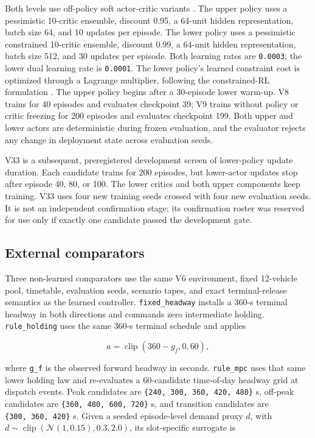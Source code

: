 \documentclass[preprint,12pt,authoryear,nopreprintline]{elsarticle}
\begin{document}
Both levels use off-policy soft actor-critic variants
\citep{haarnoja2018soft}. The upper policy uses a pessimistic 10-critic
ensemble, discount 0.95, a 64-unit hidden representation, batch size 64,
and 10 updates per episode. The lower policy uses a pessimistic
constrained 10-critic ensemble, discount 0.99, a 64-unit hidden
representation, batch size 512, and 30 updates per episode. Both
learning rates are \texttt{0.0003}; the lower dual learning rate is
\texttt{0.0001}. The lower policy's learned constraint cost is optimized
through a Lagrange multiplier, following the constrained-RL formulation
\citep{miryoosefi2019constraints}. The upper policy begins after a
30-episode lower warm-up. V8 trains for 40 episodes and evaluates
checkpoint 39; V9 trains without policy or critic freezing for 200
episodes and evaluates checkpoint 199. Both upper and lower actors are
deterministic during frozen evaluation, and the evaluator rejects any
change in deployment state across evaluation seeds.

V33 is a subsequent, preregistered development screen of lower-policy
update duration. Each candidate trains for 200 episodes, but lower-actor
updates stop after episode 40, 80, or 100. The lower critics and both
upper components keep training. V33 uses four new training seeds crossed
with four new evaluation seeds. It is not an independent confirmation
stage; its confirmation roster was reserved for use only if exactly one
candidate passed the development gate.

\subsection{External comparators}\label{external-comparators}

Three non-learned comparators use the same V6 environment, fixed
12-vehicle pool, timetable, evaluation seeds, scenario tapes, and exact
terminal-release semantics as the learned controller.
\texttt{fixed\_headway} installs a 360-s terminal headway in both
directions and commands zero intermediate holding.
\texttt{rule\_holding} uses the same 360-s terminal schedule and applies

\[a = \operatorname{clip}(360-g_f,0,60),\]

where \texttt{g\_f} is the observed forward headway in seconds.
\texttt{rule\_mpc} uses that same lower holding law and re-evaluates a
60-candidate time-of-day headway grid at dispatch events. Peak
candidates are \texttt{\{240,\ 300,\ 360,\ 420,\ 480\}} s, off-peak
candidates are \texttt{\{360,\ 480,\ 600,\ 720\}} s, and transition
candidates are \texttt{\{300,\ 360,\ 420\}} s. Given a seeded
episode-level demand proxy \(d\), with
\(d\sim\operatorname{clip}(\mathcal{N}(1,0.15),0.3,2.0)\), its
slot-specific surrogate is
\end{document}
